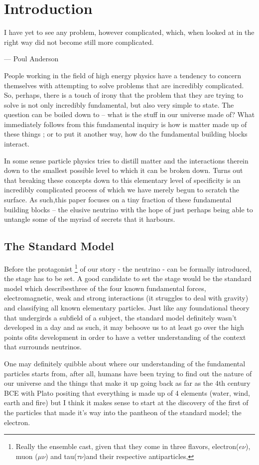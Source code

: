 \section{Introduction}

I have yet to see any problem, however complicated, which, when looked at in the right way did not become still more complicated.

\begin{flushright}--- Poul Anderson\end{flushright}

  People working in the field of high energy physics have a tendency to concern themselves with attempting to solve problems that are incredibly complicated.
  So, perhaps, there is a touch of irony that the problem that they are trying to solve is not only incredibly fundamental, but also very simple to state.
  The question can be boiled down to -- what is the stuff in our universe made of?
  What immediately follows from this fundamental inquiry is how is matter made up of these things ; or to put it another way, how do the fundamental building blocks interact.

  In some sense particle physics tries to distill matter and the interactions therein down to the smallest possible level to which it can be broken down.
  Turns out that breaking these concepts down to this elementary level of specificity is an incredibly complicated process of which we have merely begun to scratch the surface.
  As such,this paper focuses on a tiny fraction of these fundamental building blocks -- the elusive neutrino with the hope of just perhaps being able to untangle some of the myriad of secrets that it harbours.

  \subsection{The Standard Model}

  Before the protagonist
  \footnote{Really the ensemble cast, given that they come in three flavors, electron($e\nu$), muon ($\mu \nu$) and tau($\tau \nu$)and their respective antiparticles,}
  of our story - the neutrino - can be formally introduced, the stage has to be set.
  A good candidate to set the stage would be the standard model which describesthree of the four known fundamental forces, electromagnetic, weak and strong interactions (it struggles to deal with  gravity) and classifying all known elementary particles.
  Just like any foundational theory that undergirds a subfield of a subject, the standard model definitely wasn't developed in a day and as such, it may behoove us to at least go over the high points ofits development in order to have a vetter understanding of the context that surrounds neutrinos.

  One may definitely quibble about where our understanding of the fundamental particles starts from, after all, humans have been trying to find out the nature of our universe and the things that make it up going back as far as the 4th century BCE with Plato positing that everything is made up of 4 elements (water, wind, earth and fire)\cite{Timaeus} but I think it makes sense to start at the discovery of the first of the particles that made it's way into the pantheon of the standard model; the electron.
